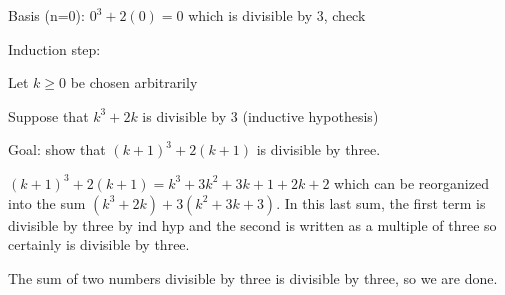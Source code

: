 \documentclass[12pt]{article}
\begin{document}
\begin{enumerate}
\begin{enumerate}
Basis (n=0):  $0^3 + 2(0) = 0$ which is divisible by 3, check

Induction step:

Let $k \geq 0$ be chosen arbitrarily

Suppose that $k^3+2k$ is divisible by 3 (inductive hypothesis)

Goal: show that $(k+1)^3 + 2(k+1)$ is divisible by three.

$(k+1)^3 + 2(k+1) = k^3 + 3k^2 + 3k +1 + 2k + 2$
which can be reorganized into the sum $(k^3 + 2k) + 3(k^2+3k+3)$.  In this last sum, the first
term is divisible by three by ind hyp and the second is written as a multiple of three so certainly is divisible by three.

The sum of two numbers divisible by three is divisible by three, so we are done.

\end{enumerate}

\newpage



\end{enumerate}
\end{document}

